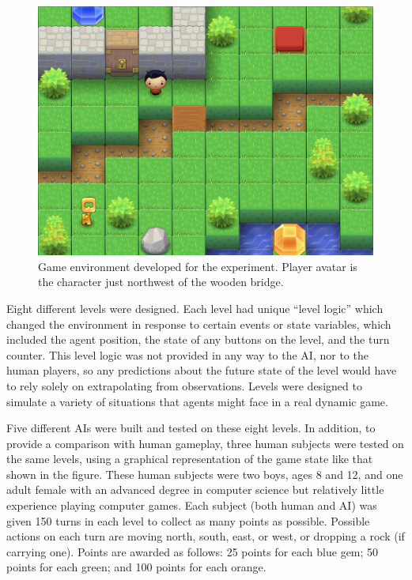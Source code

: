 \documentclass{article}
\begin{document}
\begin{figure}
  \begin{center}
    \includegraphics[width=4.5in]{figSampleMap.png}
    \caption{Game environment developed for the experiment.  Player avatar is the character just northwest of the wooden bridge.}
    \label{figSampleMap}
  \end{center}
\end{figure}

Eight different levels were designed.  Each level had unique ``level logic'' which changed the environment in response to certain events or state variables, which included the agent position, the state of any buttons on the level, and the turn counter.  This level logic was not provided in any way to the AI, nor to the human players, so any predictions about the future state of the level would have to rely solely on extrapolating from observations.  Levels were designed to simulate a variety of situations that agents might face in a real dynamic game.

Five different AIs were built and tested on these eight levels.  In addition, to provide a comparison with human gameplay, three human subjects were tested on the same levels, using a graphical representation of the game state like that shown in the figure.  These human subjects were two boys, ages 8 and 12, and one adult female with an advanced degree in computer science but relatively little experience playing computer games.  Each subject (both human and AI) was given 150 turns in each level to collect as many points as possible.  Possible actions on each turn are moving north, south, east, or west, or dropping a rock (if carrying one).  Points are awarded as follows: 25 points for each blue gem; 50 points for each green; and 100 points for each orange.
\end{document}
